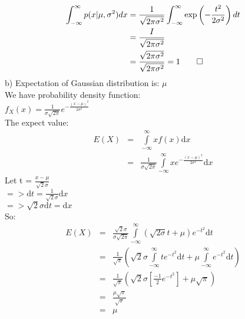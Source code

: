 \documentclass{article}
\begin{document}
\begin{align*}
    \int_{-\infty}^\infty p(x|\mu, \sigma^2) dx &= \frac{1}{\sqrt{2 \pi \sigma^2}} \int_{-\infty}^\infty \exp \left( -\frac{t^2}{2\sigma^2} \right) dt \\
    &= \frac{I}{\sqrt{2 \pi \sigma^2}} \\
    &= \frac{\sqrt{2 \pi \sigma^2}}{\sqrt{2 \pi \sigma^2}} = 1  \qed
\end{align*}
b) Expectation of Gaussian distribution is: $\mu$ \\
We have probability density function:\\
$f_X(x) = \frac{1}{\sigma\sqrt{2\pi}} e^{-\frac{(x-\mu)^2}{2\sigma^2}}$\\
The expect value:\\
\begin{eqnarray*}
    E(X) & = & \displaystyle\int\limits_{-\infty}^{\infty} xf(x) \mathrm{d}x\\
    & = & \frac{1}{\sigma \sqrt{2\pi}} \displaystyle\int\limits_{-\infty}^{\infty} x e^{-\frac{(x-\mu)^2}{2 \sigma^2}} \mathrm{d}x
\end{eqnarray*}
Let t = $\frac{x-\mu}{\sqrt{2}\sigma}$ \\
$=> \mathrm{d}t = \frac{1}{\sqrt{2}\sigma} \mathrm{d}x$ \\
$=> \sqrt{2}\sigma \mathrm{d}t = \mathrm{d}x$ \\
So:
\begin{eqnarray*}
    E(X) & = & \frac{\sqrt{2}\sigma}{\sigma\sqrt{2\pi}} \displaystyle\int\limits_{-\infty}^{\infty} (\sqrt{2\sigma}t + \mu) e^{-t^2} \mathrm{d}t \\
    & = & \frac{1}{\sqrt{\pi}} (\sqrt{2}\sigma \displaystyle\int\limits_{-\infty}^{\infty} t e^{-t^2} \mathrm{d}t + \mu \displaystyle\int\limits_{-\infty}^{\infty} e^{-t^2} \mathrm{d}t )  \\
    & = & \frac{1}{\sqrt{\pi}} (\sqrt{2}\sigma [\frac{-1}{2} e^{-t^2}] + \mu \sqrt{\pi})\\
    & = & \frac{\mu \sqrt{\pi}}{\sqrt{\pi}}\\
    & = & \mu
\end{eqnarray*}
\end{document}
